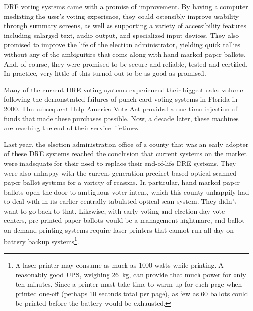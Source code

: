 \label{sec:intro}

DRE voting systems came with a promise of improvement. By having a
computer mediating the user's voting experience, they could ostensibly
improve usability through summary screens, as well as supporting a
variety of accessibility features including enlarged text, audio
output, and specialized input devices. They also promised to improve
the life of the election administrator, yielding quick tallies without
any of the ambiguities that come along with hand-marked paper ballots.
And, of course, they were promised to be secure and reliable, tested
and certified. In practice, very little of this turned out to be as
good as promised.

Many of the current DRE voting systems experienced their biggest sales
volume following the demonstrated failures of punch card voting
systems in Florida in 2000. The subsequent Help America Vote Act
provided a one-time injection of funds that made these purchases
possible. Now, a decade later, these machines are reaching the end of
their service lifetimes. 

Last year, the election administration office of a county that was an
early adopter of these DRE systems reached the conclusion that current
systems on the market were inadequate for their need to replace their
end-of-life DRE systems. They were also unhappy with the
current-generation precinct-based optical scanned paper ballot systems
for a variety of reasons. In particular, hand-marked paper ballots
open the door to ambiguous voter intent, which this county unhappily
had to deal with in its earlier centrally-tabulated optical scan
system. They didn't want to go back to that. Likewise, with early
voting and election day vote centers, pre-printed paper ballots would
be a management nightmare, and ballot-on-demand printing systems
require laser printers that cannot run all day on battery backup
systems\footnote{A laser printer may consume as much as 1000 watts
  while printing. A reasonably good UPS, weighing 26~kg, can provide
  that much power for only ten minutes. Since a printer must take time
  to warm up for each page when printed one-off (perhaps 10
  seconds total per page), as few as 60 ballots could be printed before the
  battery would be exhausted.}.

